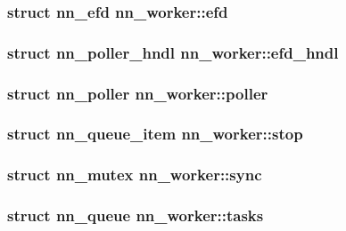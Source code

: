 \subsubsection[{efd}]{\setlength{\rightskip}{0pt plus 5cm}struct {\bf nn\+\_\+efd} nn\+\_\+worker\+::efd}\hypertarget{structnn__worker_a45741cf3ce9c128308d7c5cf63aa78bb}{}\label{structnn__worker_a45741cf3ce9c128308d7c5cf63aa78bb}
\subsubsection[{efd\+\_\+hndl}]{\setlength{\rightskip}{0pt plus 5cm}struct {\bf nn\+\_\+poller\+\_\+hndl} nn\+\_\+worker\+::efd\+\_\+hndl}\hypertarget{structnn__worker_a8898fc782028ff218b06374d8852327f}{}\label{structnn__worker_a8898fc782028ff218b06374d8852327f}
\subsubsection[{poller}]{\setlength{\rightskip}{0pt plus 5cm}struct {\bf nn\+\_\+poller} nn\+\_\+worker\+::poller}\hypertarget{structnn__worker_abb9794063c6c291431f5c851a6d88fae}{}\label{structnn__worker_abb9794063c6c291431f5c851a6d88fae}
\subsubsection[{stop}]{\setlength{\rightskip}{0pt plus 5cm}struct {\bf nn\+\_\+queue\+\_\+item} nn\+\_\+worker\+::stop}\hypertarget{structnn__worker_acecc291f2b728c891694c701eb3081f1}{}\label{structnn__worker_acecc291f2b728c891694c701eb3081f1}
\subsubsection[{sync}]{\setlength{\rightskip}{0pt plus 5cm}struct {\bf nn\+\_\+mutex} nn\+\_\+worker\+::sync}\hypertarget{structnn__worker_a3ba45d381df6a5c98db85c69d1387673}{}\label{structnn__worker_a3ba45d381df6a5c98db85c69d1387673}
\subsubsection[{tasks}]{\setlength{\rightskip}{0pt plus 5cm}struct {\bf nn\+\_\+queue} nn\+\_\+worker\+::tasks}\hypertarget{structnn__worker_af14d85b3fd5398186d17b61e4afcc9c3}{}\label{structnn__worker_af14d85b3fd5398186d17b61e4afcc9c3}
